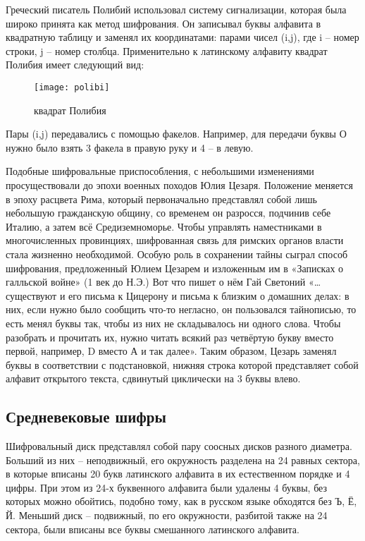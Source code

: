 Греческий писатель Полибий использовал систему сигнализации, которая была широко принята как метод шифрования. Он записывал буквы алфавита в квадратную таблицу и заменял их координатами: парами чисел (i,j), где i – номер строки, j – номер столбца. Применительно к латинскому алфавиту квадрат Полибия имеет следующий вид:

\begin{figure}[H]
	\texttt{[image: polibi]}
	\centering
	\caption{квадрат Полибия}
\end{figure}

Пары (i,j) передавались с помощью факелов. Например, для передачи буквы О нужно было взять 3 факела в правую руку и 4 – в левую.

Подобные шифровальные приспособления, с небольшими изменениями просуществовали до эпохи военных походов Юлия Цезаря. Положение меняется в эпоху расцвета Рима, который первоначально представлял собой лишь небольшую гражданскую общину, со временем он разросся, подчинив себе Италию, а затем всё Средиземноморье. Чтобы управлять наместниками в многочисленных провинциях, шифрованная связь для римских органов власти стала жизненно необходимой. Особую роль в сохранении тайны сыграл способ шифрования, предложенный Юлием Цезарем и изложенным им в «Записках о галльской войне» (1 век до Н.Э.) Вот что пишет о нём Гай Светоний «…существуют и его письма к Цицерону и письма к близким о домашних делах: в них, если нужно было сообщить что-то негласно, он пользовался тайнописью, то есть менял буквы так, чтобы из них не складывалось ни одного слова. Чтобы разобрать и прочитать их, нужно читать всякий раз четвёртую букву вместо первой, например, D вместо А и так далее». Таким образом, Цезарь заменял буквы в соответствии с подстановкой, нижняя строка которой представляет собой алфавит открытого текста, сдвинутый циклически на 3 буквы влево.\cite{senthil2013modern}

\subsection{Средневековые шифры}

Шифровальный диск представлял собой пару соосных дисков разного диаметра. Больший из них – неподвижный, его окружность разделена на 24 равных сектора, в которые вписаны 20 букв латинского алфавита в их естественном порядке и 4 цифры. При этом из 24-х буквенного алфавита были удалены 4 буквы, без которых можно обойтись, подобно тому, как в русском языке обходятся без Ъ, Ё, Й. Меньший диск – подвижный, по его окружности, разбитой также на 24 сектора, были вписаны все буквы смешанного латинского алфавита.

